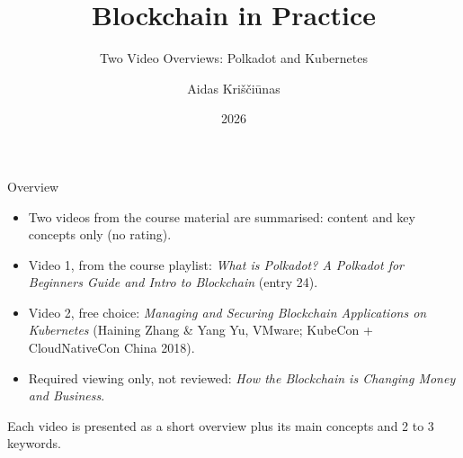 \documentclass[aspectratio=169,11pt]{beamer}
\title{Blockchain in Practice}
\subtitle{Two Video Overviews: Polkadot and Kubernetes}
\author{Aidas Kri\v{s}\v{c}i\={u}nas}
\institute{Block Chain Programming}
\date{2026}
\begin{document}
\maketitle

\begin{frame}{Overview}
  \small
  \begin{itemize}
    \item Two videos from the course material are summarised: content and key concepts only (no rating).
    \item \alert{Video 1}, from the course playlist:
          \emph{What is Polkadot? A Polkadot for Beginners Guide and Intro to Blockchain}
          (entry 24).
    \item \alert{Video 2}, free choice:
          \emph{Managing and Securing Blockchain Applications on Kubernetes}
          (Haining Zhang \& Yang Yu, VMware; KubeCon + CloudNativeCon China 2018).
    \item Required viewing only, not reviewed: \emph{How the Blockchain is Changing Money and Business}.
  \end{itemize}
  \vfill
  \footnotesize Each video is presented as a short overview plus its main concepts and 2 to 3 keywords.
\end{frame}
\end{document}
